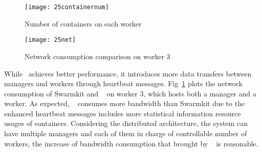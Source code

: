 \begin{figure}[ht]
   \centering
      \begin{minipage}[t]{0.48\linewidth}
\centering
      \texttt{[image: 25containernum]}
      \caption{Number of containers on each worker}
      \label{fig:num} 
      \end{minipage} %
      \begin{minipage}[t]{0.48\linewidth}
\centering
      \texttt{[image: 25net]}
      \caption{Network consumption comparison on worker 3}
      \label{fig:25net}
      \end{minipage} %
\end{figure}



While \sol~achieves better performance, it introduces more data transfers between managers and workers through heartbeat messages.
Fig~\ref{fig:25net} plots the network consumption of Swarmkit and \sol~ on worker 3, which hosts both a manager and a worker. 
As expected, \sol~ consumes more bandwidth than Swarmkit due to the enhanced heartbeat messages includes more statistical information resource
usages of containers. Considering the distributed architecture, the system can have multiple managers and each of them in charge of controllable
number of workers, the increase of bandwidth consumption that brought by \sol~ is reasonable.


